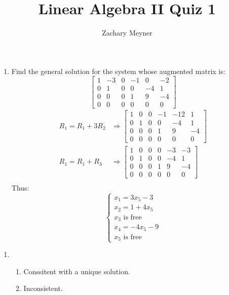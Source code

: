 \documentclass[12pt]{article}
\title{\large Linear Algebra II Quiz 1}
\author{\large Zachary Meyner}
\date{}
\begin{document}
\maketitle

\begin{enumerate}[label=\textbf{1.2.13.}]
    \item Find the general solution for the system whose augmented matrix is:
    \[
    \begin{bmatrix}
        1 & -3 & 0 & -1 & 0 & -2 \\
        0 & 1 & 0 & 0 & -4 & 1 \\
        0 & 0 & 0 & 1 & 9 & -4 \\
        0 & 0 & 0 & 0 & 0 & 0
    \end{bmatrix}
    \]
    \begin{align*}
        R_1=R_1 + 3R_2 &\Rightarrow 
        \begin{bmatrix}
            1 & 0 & 0 & -1 & -12 & 1 \\
            0 & 1 & 0 & 0 & -4 & 1 \\
            0 & 0 & 0 & 1 & 9 & -4 \\
            0 & 0 & 0 & 0 & 0 & 0
        \end{bmatrix} \\
        R_1=R_1 + R_3 &\Rightarrow 
        \begin{bmatrix}
            1 & 0 & 0 & 0 & -3 & -3 \\
            0 & 1 & 0 & 0 & -4 & 1 \\
            0 & 0 & 0 & 1 & 9 & -4 \\
            0 & 0 & 0 & 0 & 0 & 0
        \end{bmatrix} \\
    \end{align*}
    Thus:
    \[
    \begin{cases}
        x_1 = 3x_5 - 3 \\
        x_2= 1 + 4x_5 \\
        x_3 \text{ is free} \\
        x_4 = -4x_5 - 9 \\
        x_5 \text{ is free}
    \end{cases}
    \]
\end{enumerate}
\begin{enumerate}[label=\textbf{1.2.19.}]
    \item \begin{enumerate}[label=\alph*.]
        \item Conssitent with a unique solution.
        \item Inconsistent.
    \end{enumerate}
\end{enumerate}
\end{document}
